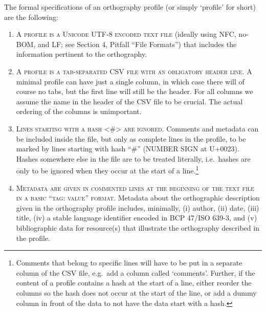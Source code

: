 The formal specifications of an orthography profile (or simply `profile' for short) are the following:
\begin{enumerate}
	\def\labelenumi{\arabic{enumi}.} 
	\item \textsc{A profile is a} \textsc{Unicode UTF-8 encoded text file} (ideally using NFC, no-BOM, and LF; see Section 4, Pitfall ``File Formats'') that includes the information pertinent to the orthography. 
	\item \textsc{A profile is a} \textsc{tab-separated CSV file with an obligatory header line}. A minimal profile can have just a single column, in which case there will of course no tabs, but the first line will still be the header. For all columns we assume the name in the header of the CSV file to be crucial. The actual ordering of the columns is unimportant. 
	\item \textsc{Lines starting with a hash \textless{}\#\textgreater{} are ignored.} Comments and metadata can be included inside the file, but only as complete lines in the profile, to be marked by lines starting with hash ``\#'' (NUMBER SIGN at U+0023). Hashes somewhere else in the file are to be treated literally, i.e.~hashes are only to be ignored when they occur at the start of a line.\footnote{Comments that belong to specific lines will have to be put in a separate column of the CSV file, e.g.~add a column called `comments'. Further, if the content of a profile contains a hash at the start of a line, either reorder the columns so the hash does not occur at the start of the line, or add a dummy column in front of the data to not have the data start with a hash.} 
	\item \textsc{Metadata are given in commented lines at the beginning of the text file in a basic ``tag: value'' format. }Metadata about the orthographic description given in the orthography profile includes, minimally, (i) author, (ii) date, (iii) title, (iv) a stable language identifier encoded in BCP 47/ISO 639-3, and (v) bibliographic data for resource(s) that illustrate the orthography described in the profile. 
\end{enumerate}

